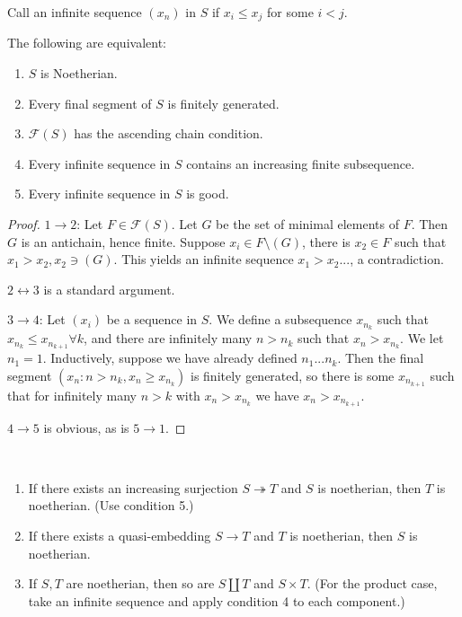 Call an infinite sequence $(x_n)$ in $S$  if $x_i \leq x_j$ for some $i<j$.
\begin{proposition} %
The following are equivalent:
\begin{enumerate}
	\item  $S$ is Noetherian.
	\item  Every final segment of $S$ is finitely generated.
	\item  $\mathcal{F}(S)$ has the ascending chain condition.
	\item  Every infinite sequence in $S$ contains an increasing finite subsequence.
	\item  Every infinite sequence in $S$ is good.
\end{enumerate}
 \end{proposition}

\begin{proof} %
$1 \rightarrow 2$: Let $F \in \mathcal{F}(S)$. Let $G$ be the set of minimal elements of $F$. Then $G$ is an antichain, hence finite. Suppose $x_i \in F \setminus (G)$, there is $x_2 \in F$ such that $x_1 > x_2, x_2 \ni (G)$. This yields an infinite sequence $x_1 > x_2...$, a contradiction.

$2 \leftrightarrow 3$ is a standard argument.

$3 \rightarrow 4$: Let $(x_i)$ be a sequence in $S$. We define a subsequence $x_{n_k}$ such that $x_{n_k} \leq x_{n_{k+1}} \forall k$, and there are infinitely many $n > n_k$ such that $x_n > x_{n_k}$. We let $n_1 = 1$. Inductively, suppose we have already defined $n_1...n_k$. Then the final segment $(x_n: n > n_k, x_n \geq x_{n_k})$ is finitely generated, so there is some $x_{n_{k+1}}$ such that for infinitely many $n>k$ with $x_n > x_{n_k}$ we have $x_n > x_{n_{k+1}}$.

$4 \rightarrow 5$ is obvious, as is $5 \rightarrow 1$.
 \end{proof}

\begin{corollary} \ %
\label{4.3}
\begin{enumerate}
	\item If there exists an increasing surjection $S \twoheadrightarrow T$ and $S$ is noetherian, then $T$ is noetherian. (Use condition 5.)
	\item If there exists a quasi-embedding $S \rightarrow T$ and $T$ is noetherian, then $S$ is noetherian.
	\item If $S, T$ are noetherian, then so are $S \coprod T$ and $S \times T$. (For the product case, take an infinite sequence and apply condition 4 to each component.)
\end{enumerate}
 \end{corollary}

